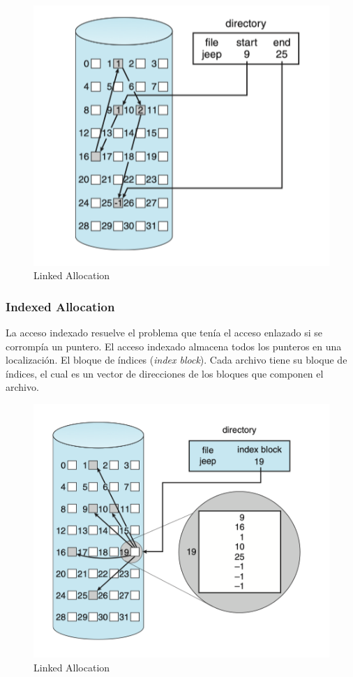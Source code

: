 \begin{figure}[H]
    \centering
    \includegraphics[scale=0.6]{doc/assets/images/Allocation Methods/linked.png}
    \caption{Linked Allocation}
    \label{fig:my_label}
\end{figure}

\subsubsection{Indexed Allocation}
La acceso indexado resuelve el problema que tenía el acceso enlazado si se corrompía un puntero. El acceso indexado almacena todos los punteros en una localización. El bloque de índices (\textit{index block}). 
Cada archivo tiene su bloque de índices, el cual es un vector de direcciones de los bloques que componen el archivo. \cite{silberchatz}


\begin{figure}[H]
    \centering
    \includegraphics[scale=0.6]{doc/assets/images/Allocation Methods/indexed.png}
    \caption{Linked Allocation}
    \label{fig:my_label}
\end{figure}


